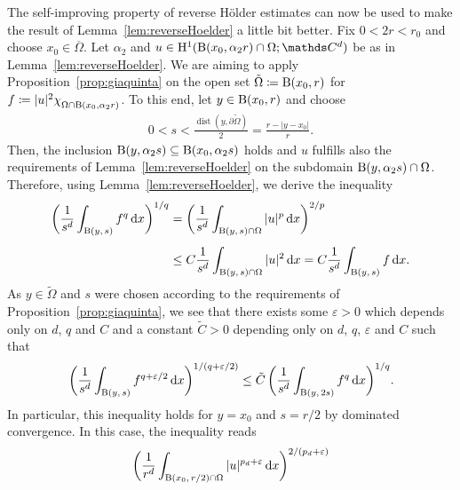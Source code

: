   \begin{rem}
    \label{rem:reverseHoelder}
    The self-improving property of reverse Hölder estimates can now be used to make the result of Lemma~\ref{lem:reverseHoelder} a little bit better. 
    Fix $0 < 2r < r_0$ and choose $x_0 \in \overline\Omega$.
    Let $\alpha_2$ and $u \in \HH^1(\BB(x_0, \alpha_2 r) \cap \Omega; \C^d)$ be as in Lemma~\ref{lem:reverseHoelder}.
    We are aiming to apply Proposition~\ref{prop:giaquinta} on the open set $\tilde\Omega \coloneqq \mathrm{B}(x_0,r)$ for 
    $f \coloneqq |u|^2 \chi^{}_{\Omega \cap \mathrm{B}(x_0, \alpha_2 r)}$.
    To this end, let $y \in \mathrm{B}(x_0, r)$ and choose 
    \begin{align*}
      0 < s < \frac{\operatorname{dist}(y, \partial\tilde\Omega)}{2} = \frac{r - |y - x_0|}{r}.
    \end{align*}
    Then, the inclusion $\mathrm{B}(y, \alpha_2 s) \subseteq \mathrm{B}(x_0, \alpha_2 s)$ holds and $u$ fulfills also the requirements of Lemma~\ref{lem:reverseHoelder} on the subdomain $\mathrm{B}(y, \alpha_2 s) \cap \Omega$.
    Therefore, using Lemma~\ref{lem:reverseHoelder}, we derive the inequality
    \begin{align*}
      \bigg( \frac{1}{s^d} \int_{\mathrm{B}(y,\, s)} f^q \, {\operatorname{d}\!{x}} \bigg)^{1/q} 
      &= \bigg( \frac{1}{s^d} \int_{\mathrm{B}(y,\, s) \cap \Omega} |u|^p \, {\operatorname{d}\!{x}} \bigg)^{2 / p} \\[0.5em]
      &\leq C \frac{1}{s^d} \int_{\mathrm{B}(y,\, s) \cap \Omega} |u|^2 \, {\operatorname{d}\!{x}}
      = C \frac{1}{s^d} \int_{\mathrm{B}(y,\, s)} f \, {\operatorname{d}\!{x}}.
    \end{align*}
    As $y \in \tilde\Omega$ and $s$ were chosen according to the requirements of Proposition~\ref{prop:giaquinta}, we see that there exists some $\varepsilon > 0$ which depends only on $d$, $q$ and $C$ and a constant $\tilde C >0$ depending only on $d$, $q$, $\varepsilon$ and $C$ such that
    \begin{align*}
      \bigg( \frac{1}{s^d} \int_{\mathrm{B}(y,\, s)} f^{q + \varepsilon/2} \, {\operatorname{d}\!{x}} \bigg)^{1/(q + \varepsilon/2) }
      \leq \tilde C\, \bigg( \frac{1}{s^d} \int_{\mathrm{B}(y,\, 2 s)} f^q \, {\operatorname{d}\!{x}} \bigg)^{1/q}. 
    \end{align*}
    In particular, this inequality holds for $y = x_0$ and $s = r/2$ by dominated convergence.
    In this case, the inequality reads
    \begin{align*}
      \bigg( \frac{1}{r^d} \int_{\BB(x_0,\, r/2) \cap \Omega} |u|^{p_d + \varepsilon}\d x \bigg)^{2/(p_d + \varepsilon)} 

\end{align*}
\end{rem}
